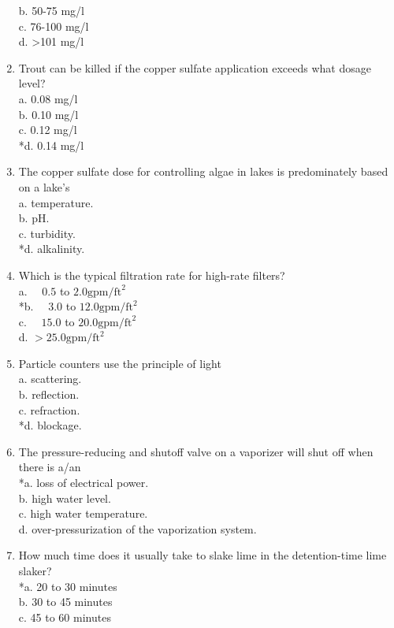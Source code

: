 \begin{enumerate}
b.  50-75 mg/l\\
c.  76-100 mg/l\\
d.  >101 mg/l\\
\item Trout can be killed if the copper sulfate application exceeds what dosage level?\\
a. 0.08 mg/l\\
b. 0.10 mg/l\\
c. 0.12 mg/l\\
*d. 0.14 mg/l\\
\item The copper sulfate dose for controlling algae in lakes is predominately based on a lake's\\
a. temperature.\\
b. pH.\\
c. turbidity.\\
*d. alkalinity.\\
\item Which is the typical filtration rate for high-rate filters?\\
a. $\quad 0.5$ to $2.0 \mathrm{gpm} / \mathrm{ft}^{2}$\\
*b. $\quad 3.0$ to $12.0 \mathrm{gpm} / \mathrm{ft}^{2}$\\
c. $\quad 15.0$ to $20.0 \mathrm{gpm} / \mathrm{ft}^{2}$\\
d. $>25.0 \mathrm{gpm} / \mathrm{ft}^{2}$\\
\item Particle counters use the principle of light\\
a. scattering.\\
b. reflection.\\
c. refraction.\\
*d. blockage.\\
\item The pressure-reducing and shutoff valve on a vaporizer will shut off when there is a/an\\
*a. loss of electrical power.\\
b. high water level.\\
c. high water temperature.\\
d. over-pressurization of the vaporization system.
\item How much time does it usually take to slake lime in the detention-time lime slaker?\\
*a. 20 to 30 minutes\\
b. 30 to 45 minutes\\
c. 45 to 60 minutes\\

\end{enumerate}
